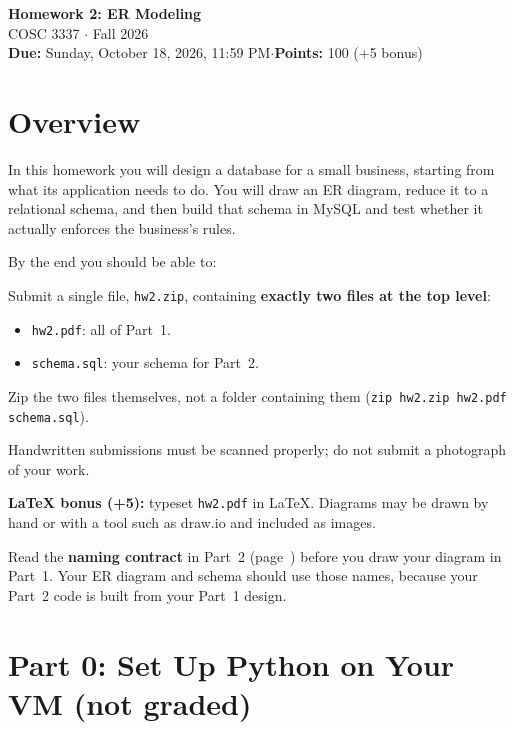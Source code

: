 \documentclass[11pt]{article}
\newcommand{\duedate}{Sunday, October 18, 2026, 11:59 PM}
\newcommand{\hwnum}{2}
\newcommand{\code}[1]{\texttt{#1}}
\begin{document}
\begin{center}
  {\LARGE\bfseries Homework \hwnum: ER Modeling}\\[4pt]
  {\large COSC 3337 $\cdot$ Fall 2026}\\[4pt]
  \textbf{Due:} \duedate \quad$\cdot$\quad \textbf{Points:} 100 (+5 bonus)
\end{center}

\section*{Overview}

In this homework you will design a database for a small business, starting from what its
application needs to do. You will draw an ER diagram, reduce it to a relational
schema, and then build that schema in MySQL and test whether it
actually enforces the business's rules.

By the end you should be able to:

\begin{infobox}[title=Submission]
Submit a single file, \code{hw\hwnum.zip}, containing \textbf{exactly two files at the top level}:
\begin{itemize}[nosep]
  \item \code{hw\hwnum.pdf}: all of Part~1.
  \item \code{schema.sql}: your schema for Part~2.
\end{itemize}
Zip the two files themselves, not a folder containing them (\code{zip hw\hwnum.zip hw\hwnum.pdf schema.sql}).

Handwritten submissions must be scanned properly; do not submit a photograph of your work.

\textbf{LaTeX bonus (+5):} typeset \code{hw\hwnum.pdf} in LaTeX. Diagrams may be drawn by hand or with a tool such as draw.io and included as images.
\end{infobox}

\begin{warnbox}[title=Before you start]
Read the \textbf{naming contract} in Part~2 (page~\pageref{sec:contract}) before you draw your
diagram in Part~1. Your ER diagram and schema should use those names, because your Part~2 code
is built from your Part~1 design.
\end{warnbox}

\section*{Part 0: Set Up Python on Your VM \hfill (not graded)}
\end{document}
